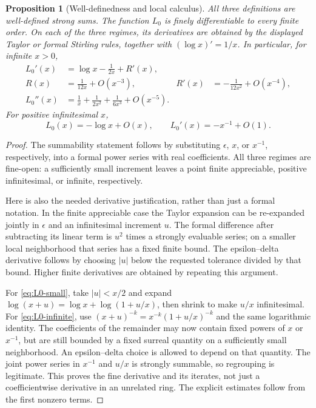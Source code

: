 \documentclass[11pt,letterpaper]{article}
\numberwithin{equation}{section}
\theoremstyle{plain}
\newtheorem{proposition}[proposition]{Proposition}
\theoremstyle{definition}
\theoremstyle{remark}
\newcommand{\abs}[1]{\lvert#1\rvert}
\begin{document}
\begin{proposition}[Well-definedness and local calculus]\label{prop:baseline-calculus}
All three definitions are well-defined strong sums. The function $L_0$ is
finely differentiable to every finite order. On each of the three regimes,
its derivatives are obtained by the displayed Taylor or formal Stirling
rules, together with $(\log x)'=1/x$. In particular, for infinite $x>0$,
\begin{align}
 L_0'(x)&=\log x-\frac1{2x}+R'(x),\label{eq:digamma}\\
 R(x)&=\frac1{12x}+O(x^{-3}),&
 R'(x)&=-\frac1{12x^2}+O(x^{-4}),\label{eq:R-bounds}\\
 L_0''(x)&=\frac1x+\frac1{2x^2}+\frac1{6x^3}+O(x^{-5}).
\end{align}
For positive infinitesimal $x$,
\begin{equation}\label{eq:small-bounds}
 L_0(x)=-\log x+O(x),\qquad L_0'(x)=-x^{-1}+O(1).
\end{equation}
\end{proposition}

\begin{proof}
The summability statement follows by substituting $\epsilon$, $x$, or
$x^{-1}$, respectively, into a formal power series with real coefficients.
All three regimes are fine-open: a sufficiently small increment leaves a
point finite appreciable, positive infinitesimal, or infinite, respectively.

Here is also the needed derivative justification, rather than just a formal
notation. In the finite appreciable case the Taylor expansion can be
re-expanded jointly in $\epsilon$ and an infinitesimal increment $u$.
The formal difference after subtracting its linear term is $u^2$ times a
strongly evaluable series; on a smaller local neighborhood that series has
a fixed finite bound. The epsilon--delta derivative follows by choosing
$\abs u$ below the requested tolerance divided by that bound. Higher
finite derivatives are obtained by repeating this argument.

For \eqref{eq:L0-small}, take $\abs u< x/2$ and expand
$\log(x+u)=\log x+\log(1+u/x)$, then shrink to make $u/x$
infinitesimal. For \eqref{eq:L0-infinite}, use
$(x+u)^{-k}=x^{-k}(1+u/x)^{-k}$ and the same logarithmic identity.
The coefficients of the remainder may now contain fixed powers of $x$ or
$x^{-1}$, but are still bounded by a fixed surreal quantity on a sufficiently
small neighborhood. An epsilon--delta choice is allowed to depend on that
quantity. The joint power series in $x^{-1}$ and $u/x$ is strongly summable,
so regrouping is legitimate. This proves the fine derivative and its
iterates, not just a coefficientwise derivative in an unrelated ring.
The explicit estimates follow from the first nonzero terms.
\end{proof}
\end{document}
